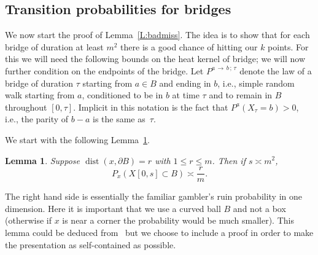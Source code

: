 \documentclass[10pt]{amsart}
\newtheorem{lemm}[theo]{Lemma}\newtheorem{prop}[theo]{Proposition}\newtheorem{coro}[theo]{Corollary}\newtheorem{conj}[theo]{Conjecture}
\theoremstyle{definition}\newtheorem{defi}[theo]{Definition}\newtheorem{rema}[theo]{Remark}\newtheorem{exam}[theo]{Example}\newtheorem{exem}[theo]{Example}\newtheorem{nota}[theo]{Notation}
\DeclareMathOperator{\dist}{dist}
\newcommand{\Pmh}{P}
\begin{document}
\subsection{Transition probabilities for bridges}
\label{S:bridge_trans}

We now start the proof of Lemma~\ref{L:badmiss}. The idea is to show that for each bridge of duration at least $m^2$ there is a good chance of hitting our $k$ points. For this we will need the following bounds on the heat kernel of bridge; we will now further condition on the endpoints of the bridge. Let $\Pmh^{a\,\to\,b\,;\,\tau}$ denote the law of a bridge of duration $\tau$ starting from $a \in B$ and ending in $b$, i.e., simple random walk starting from $a$, conditioned to be in $b$ at time $\tau$ and to remain in $B$ throughout $[0, \tau]$. Implicit in this notation is the fact that $\Pmh^a (X_\tau = b) >0$, i.e., the parity of $b-a$ is the same as~$\tau$.

We start with the following Lemma~\ref{L:stayinball}.

\begin{lemm}\label{L:stayinball}
Suppose $\dist (x, \partial B) =r$ with $1\le r \le m$. Then if $s \asymp m^2$,
\begin{equation}\label{eq:Exc}
\Pmh_x(X[0, s] \subset B) \asymp \frac{r}{m}.
\end{equation}
\end{lemm}

The right hand side is essentially the familiar gambler's ruin probability in one dimension. Here it is important that we use a curved ball $B$ and not a box (otherwise if $x$ is near a corner the probability would be much smaller). This lemma could be deduced from~\cite[Proposition~6.9.4]{LL} but we choose to include a proof in order to make the presentation as self-contained as possible.
\end{document}
